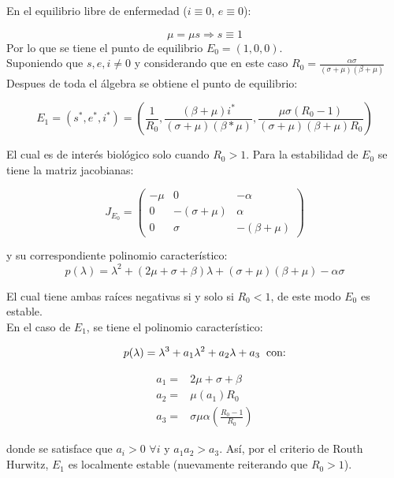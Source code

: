 \documentclass[10pt,oneside]{article}
\theoremstyle{definition}
\begin{document}
\begin{multicols}{2}
    En el equilibrio libre de enfermedad ($i\equiv 0$, $e\equiv0$): 

    $$\mu=\mu s \Rightarrow s\equiv 1$$ Por lo que se tiene el punto de equilibrio $E_0=(1,0,0)$. \\ \newline Suponiendo que $s,e,i \neq0$ y considerando que en este caso $R_0=\displaystyle{\frac{\alpha\sigma}{(\sigma+\mu)(\beta+\mu)}}$ Despues de toda el álgebra se obtiene el punto de equilibrio: 
    
    $$E_1=(s^
    *, e^{*}, i^*)=\left(\frac{1}{R_0},\frac{(\beta+\mu)i^*}{(\sigma+\mu)(\beta*\mu)},\frac{\mu\sigma(R_0-1)}{(\sigma+\mu)(\beta+\mu)R_0}\right)$$

    El cual es de interés biológico solo cuando $R_0>1$. Para la estabilidad de $E_0$ se tiene la matriz jacobianas:

    $$J_{E_0}=\left(\begin{array}{ccc}
       -\mu  & 0 & -\alpha\\
        0 & -(\sigma+\mu) &\alpha \\
        0 & \sigma & -(\beta+\mu)
    \end{array}\right)$$
    
    y su correspondiente polinomio característico: 
    $$p(\lambda)=\lambda^2+(2\mu+\sigma+\beta)\lambda+(\sigma+\mu)(\beta+\mu)-\alpha\sigma$$

    El cual tiene ambas raíces negativas si y solo si $R_0<1$, de este modo $E_0$ es estable. \\\newline En el caso de $E_1$, se tiene el polinomio característico:

    $$p(\lambda)=\lambda^3+a_1\lambda^2+a_2\lambda+a_3\hspace{0.2cm} \textnormal{con:}$$

    $$\begin{array}{cc}
         a_1=&2\mu+\sigma+\beta  \\
         a_2=&\mu(a_1)R_0  \\
         a_3=&\sigma\mu\alpha\displaystyle{\left(\frac{R_0-1}{R_0}\right)} 
    \end{array}$$

    donde se satisface que $a_i>0$ $\forall i$ y $a_1a_2>a_3$. Así, por el criterio de Routh Hurwitz, $E_1$ es localmente estable (nuevamente reiterando que $R_0>1$).
    
    

    
    
    
\end{multicols}
   

    


\end{document}
